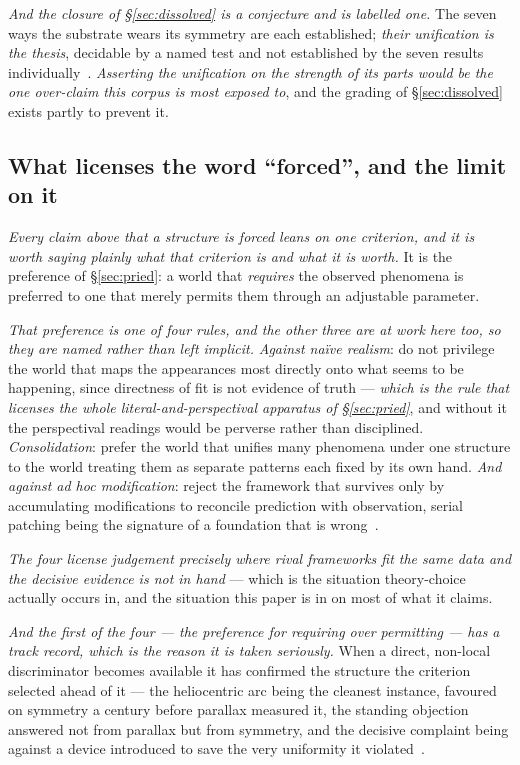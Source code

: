 \documentclass[11pt,a4paper]{article}
\theoremstyle{plain}
\theoremstyle{definition}
\begin{document}
\emph{And the closure of \S\ref{sec:dissolved} is a conjecture and is labelled one.} The seven ways the
substrate wears its symmetry are each established; \emph{their unification is the thesis}, decidable by a
named test and not established by the seven results
individually~\cite{JanzenGeometricCore}. \emph{Asserting the unification on the strength of its parts would
be the one over-claim this corpus is most exposed to}, and the grading of \S\ref{sec:dissolved} exists partly
to prevent it.

\subsection{What licenses the word ``forced'', and the limit on it}

\emph{Every claim above that a structure is forced leans on one criterion, and it is worth saying plainly
what that criterion is and what it is worth.} It is the preference of \S\ref{sec:pried}: a world that
\emph{requires} the observed phenomena is preferred to one that merely permits them through an adjustable
parameter.

\emph{That preference is one of four rules, and the other three are at work here too, so they are named
rather than left implicit.} \emph{Against naïve realism}: do not privilege the world that maps the
appearances most directly onto what seems to be happening, since directness of fit is not evidence of truth
--- \emph{which is the rule that licenses the whole literal-and-perspectival apparatus of
\S\ref{sec:pried}}, and without it the perspectival readings would be perverse rather than
disciplined. \emph{Consolidation}: prefer the world that unifies many phenomena under one structure to the
world treating them as separate patterns each fixed by its own hand. \emph{And against ad hoc modification}:
reject the framework that survives only by accumulating modifications to reconcile prediction with
observation, serial patching being the signature of a foundation that is
wrong~\cite{JanzenShadowExistence}.

\emph{The four license judgement precisely where rival frameworks fit the same data and the decisive
evidence is not in hand} --- which is the situation theory-choice actually occurs in, and the situation this
paper is in on most of what it claims.

\emph{And the first of the four --- the preference for requiring over permitting --- has a track record, which
is the reason it is taken seriously.} When a direct, non-local discriminator becomes available it has confirmed the structure the
criterion selected ahead of it --- the heliocentric arc being the cleanest instance, favoured on symmetry a
century before parallax measured it, the standing objection answered not from parallax but from symmetry, and
the decisive complaint being against a device introduced to save the very uniformity it
violated~\cite{JanzenShadowExistence}.
\end{document}
